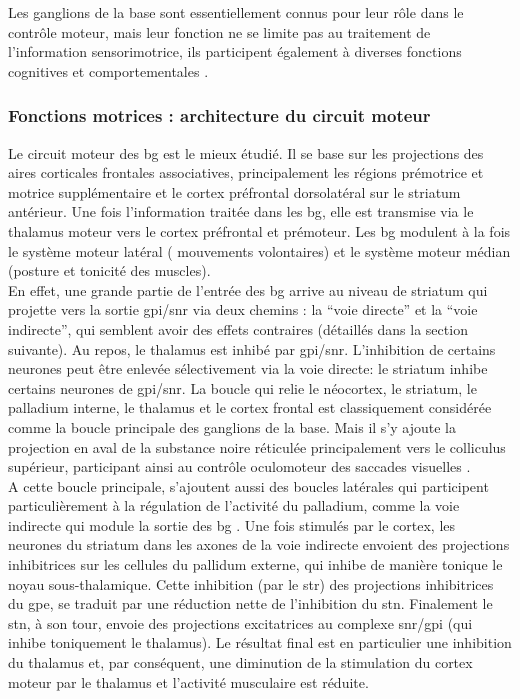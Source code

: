 Les ganglions de la base sont essentiellement connus pour leur rôle dans le contrôle moteur, mais leur fonction ne se limite pas au traitement de l'information sensorimotrice, ils participent également à diverses fonctions cognitives et comportementales \cite{Middleton:2000}.\\

\subsubsection{Fonctions motrices : architecture du circuit moteur}

Le circuit moteur des \gls{bg} est le mieux étudié. Il se base sur les projections des aires corticales frontales associatives, principalement les régions prémotrice et motrice supplémentaire et le cortex préfrontal dorsolatéral sur le striatum antérieur. Une fois l'information traitée dans les \gls{bg}, elle est transmise via le thalamus moteur vers le cortex préfrontal et prémoteur. Les \gls{bg} modulent à la fois le système moteur latéral ( mouvements volontaires) et le système moteur médian (posture et tonicité des muscles).\\

En effet, une grande partie de l'entrée des \gls{bg} arrive au niveau de striatum qui projette vers la sortie \gls{gpi}/\gls{snr} via deux chemins : la ``voie directe'' et la ``voie indirecte'', qui semblent avoir des effets contraires \cite{Albin:1989} (détaillés dans la section suivante). Au repos, le thalamus est inhibé par \gls{gpi}/\gls{snr}. L'inhibition de certains neurones peut être enlevée sélectivement via la voie directe: le striatum inhibe certains neurones de \gls{gpi}/\gls{snr}. La boucle qui relie le néocortex, le striatum, le palladium interne, le thalamus et le cortex frontal est classiquement considérée comme la boucle principale des ganglions de la base. Mais il s'y ajoute la projection en aval de la substance noire réticulée principalement vers le colliculus supérieur, participant ainsi au contrôle oculomoteur des saccades visuelles \cite{Graybiel:1978, Hikosaka:1983a, Hikosaka:1983b, Hikosaka:1983c}.\\

A cette boucle principale, s'ajoutent aussi des boucles latérales qui participent particulièrement à la régulation de l'activité du palladium, comme la voie indirecte qui module la sortie des \gls{bg} \cite{Percheron:1991}. Une fois stimulés par le cortex, les neurones du striatum dans les axones de la voie indirecte envoient des projections inhibitrices sur les cellules du pallidum externe, qui inhibe de manière tonique le noyau sous-thalamique. Cette inhibition (par le \gls{str}) des projections inhibitrices du \gls{gpe}, se traduit par une réduction nette de l'inhibition du \gls{stn}. Finalement le \gls{stn}, à son tour, envoie des projections excitatrices au complexe \gls{snr}/\gls{gpi} (qui inhibe toniquement le thalamus). Le résultat final est en particulier une inhibition du thalamus et, par conséquent, une diminution de la stimulation du cortex moteur par le thalamus et l'activité musculaire est réduite.\\

